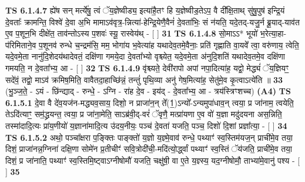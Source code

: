 \documentclass[17pt]{extarticle}
\begin{document}
                  \newline
                                \textbf{ TS 6.1.4.7} \newline
                  ह्ये॑ष सन् मर्त्ये॑षु॒ त्वं ॅय॒ज्ञेष्वीड्य॒ इत्या॑है॒तꣳ हि य॒ज्ञेष्वीड॒तेऽप॒ वै दी᳚क्षि॒ताथ् सु॑षु॒पुष॑ इन्द्रि॒यं दे॒वताः᳚ क्रामन्ति॒ विश्वे॑ दे॒वा अ॒भि मामाऽव॑वृत्र॒-न्नित्या॑-हेन्द्रि॒येणै॒वैनं॑ दे॒वता॑भिः॒ सं न॑यति॒ यदे॒तद्-यजु॒र्न ब्रू॒याद्-याव॑त ए॒व प॒शून॒भि दीक्षे॑त॒ ताव॑न्तोऽस्य प॒शवः॑ स्यू॒ रास्वेय॑थ् - [  ] \textbf{  31} \newline
                  \newline
                                \textbf{ TS 6.1.4.8} \newline
                  सो॒माऽऽ* भूयो॑ भ॒रेत्या॒हा-प॑रिमिताने॒व प॒शूनव॑ रुन्धे च॒न्द्रम॑सि॒ मम॒ भोगा॑य भ॒वेत्या॑ह यथादेव॒तमे॒वैनाः॒ प्रति॑ गृह्णाति वा॒यवे᳚ त्वा॒ वरु॑णाय॒ त्वेति॒ यदे॒वमे॒ता नानु॑दि॒शेदय॑थादेवतं॒ दक्षि॑णा गमये॒दा दे॒वता᳚भ्यो वृश्च्येत॒ यदे॒वमे॒ता अ॑नुदि॒शति॑ यथादेव॒तमे॒व दक्षि॑णा गमयति॒ न दे॒वता᳚भ्य॒ आ - [  ] \textbf{  32 } \newline
                  \newline
                                \textbf{ TS 6.1.4.9} \newline
                  वृ॑श्च्यते॒ देवी॑रापो अपां नपा॒दित्या॑ह॒ यद्वो॒ मेद्ध्यं॑ ॅय॒ज्ञियꣳ॒॒ सदे॑वं॒ तद्वो॒ माऽव॑ क्रमिष॒मिति॒ वावैतदा॒हाच्छि॑न्नं॒ तन्तुं॑ पृथि॒व्या अनु॑ गेष॒मित्या॑ह॒ सेतु॑मे॒व कृ॒त्वाऽत्ये॑ति ॥ \textbf{  33 } \newline
                  \newline
                      (भु॒ञ्ज॒ते॒ - ऽयं - छि॑न्द्याद् - रुन्धे॒ - ऽग्नि - रा॑ह दे॒व - इय॑द् - दे॒वता᳚भ्य॒ आ - त्रय॑स्त्रिꣳशच्च)  \textbf{(A4)} \newline \newline
                                        \textbf{ TS 6.1.5.1} \newline
                  दे॒वा वै दे॑व॒यज॑न-मद्ध्यव॒साय॒ दिशो॒ न प्राजा॑न॒न् ते᳚(1॒)ऽन्यो᳚-ऽन्यमुपा॑धाव॒न् त्वया॒ प्र जा॑नाम॒ त्वयेति॒ तेऽदि॑त्याꣳ॒॒ सम॒॑द्ध्रयन्त॒ त्वया॒ प्र जा॑ना॒मेति॒ साऽब्र॑वी॒द्-वरं॑ ॅवृणै॒ मत्प्रा॑यणा ए॒व वो॑ य॒ज्ञा मदु॑दयना अस॒न्निति॒ तस्मा॑दादि॒त्यः प्रा॑य॒णीयो॑ य॒ज्ञाना॑मादि॒त्य उ॑दय॒नीयः॒ पञ्च॑ दे॒वता॑ यजति॒ पञ्च॒ दिशो॑ दि॒शां प्रज्ञा᳚त्या॒ - [  ] \textbf{  34} \newline
                  \newline
                                \textbf{ TS 6.1.5.2} \newline
                  अथो॒ पञ्चा᳚क्षरा प॒ङ्क्तिः पाङ्क्तो॑ य॒ज्ञो य॒ज्ञ्मे॒वाव॑ रुन्धे॒ पथ्याꣳ॑ स्व॒स्तिम॑यज॒न् प्राची॑मे॒व तया॒ दिशं॒ प्राजा॑नन्न॒ग्निना॑ दक्षि॒णा सोमे॑न प्र॒तीचीꣳ॑ सवि॒त्रोदी॑ची॒-मदि॑त्यो॒र्द्ध्वां पथ्याꣳ॑ स्व॒स्तिं  ॅय॑जति॒ प्राची॑मे॒व तया॒ दिशं॒ प्र जा॑नाति॒ पथ्याꣳ॑ स्व॒स्तिमि॒ष्ट्वाऽग्नीषोमौ॑ यजति॒ चक्षु॑षी॒ वा ए॒ते य॒ज्ञ्स्य॒ यद॒ग्नीषोमौ॒ ताभ्या॑मे॒वानु॑ पश्य - [  ] \textbf{  35} \newline
\end{document}
